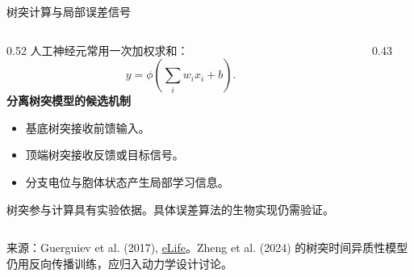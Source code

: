\documentclass[UTF8,aspectratio=169,10pt,fontset=fandol]{ctexbeamer}
\newcommand{\source}[1]{\par\vfill{\tiny\color{Muted}来源：#1}}
\newcommand{\paper}[2]{\href{#1}{#2}}
\begin{document}
\begin{frame}{树突计算与局部误差信号}
  \begin{columns}[T,onlytextwidth]
    \begin{column}{0.52\textwidth}
      人工神经元常用一次加权求和：
      \[
        y=\phi\!\left(\sum_iw_ix_i+b\right).
      \]
      \textbf{分离树突模型的候选机制}
      \begin{itemize}
        \item 基底树突接收前馈输入。
        \item 顶端树突接收反馈或目标信号。
        \item 分支电位与胞体状态产生局部学习信息。
      \end{itemize}
      \alert{树突参与计算具有实验依据。具体误差算法的生物实现仍需验证。}
    \end{column}
    \begin{column}{0.43\textwidth}
      \centering
    \end{column}
  \end{columns}
  \source{Guerguiev et al. (2017), \paper{https://elifesciences.org/articles/22901}{eLife}。Zheng et al. (2024) 的树突时间异质性模型仍用反向传播训练，应归入动力学设计讨论。}
\end{frame}
\end{document}
